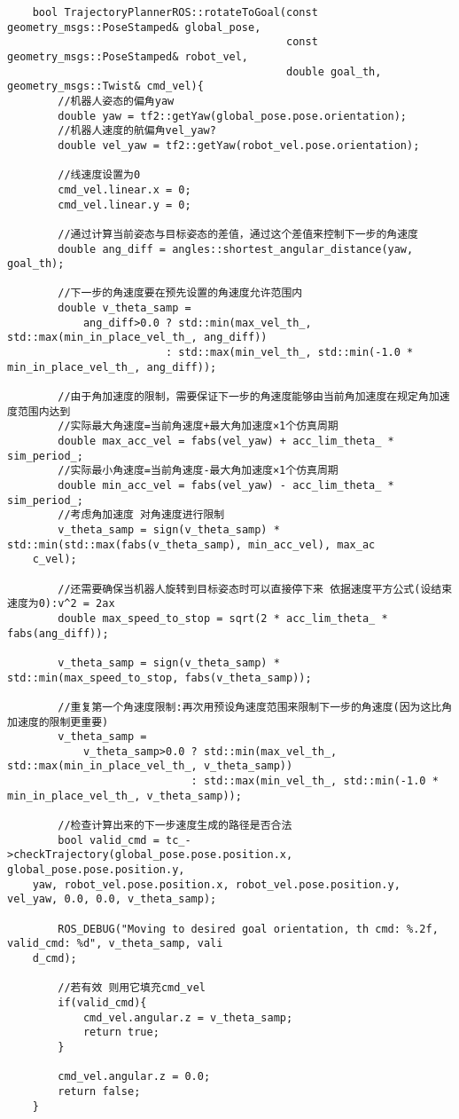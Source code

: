 \documentclass[9pt, oneside]{book}
\begin{document}
\footnotesize
\begin{verbatim}
    bool TrajectoryPlannerROS::rotateToGoal(const geometry_msgs::PoseStamped& global_pose, 
                                            const geometry_msgs::PoseStamped& robot_vel, 
                                            double goal_th, geometry_msgs::Twist& cmd_vel){
        //机器人姿态的偏角yaw
        double yaw = tf2::getYaw(global_pose.pose.orientation);
        //机器人速度的航偏角vel_yaw? 
        double vel_yaw = tf2::getYaw(robot_vel.pose.orientation);
        
        //线速度设置为0
        cmd_vel.linear.x = 0;
        cmd_vel.linear.y = 0;

        //通过计算当前姿态与目标姿态的差值，通过这个差值来控制下一步的角速度
        double ang_diff = angles::shortest_angular_distance(yaw, goal_th);

        //下一步的角速度要在预先设置的角速度允许范围内
        double v_theta_samp = 
            ang_diff>0.0 ? std::min(max_vel_th_, std::max(min_in_place_vel_th_, ang_diff)) 
                         : std::max(min_vel_th_, std::min(-1.0 * min_in_place_vel_th_, ang_diff));

        //由于角加速度的限制，需要保证下一步的角速度能够由当前角加速度在规定角加速度范围内达到
        //实际最大角速度=当前角速度+最大角加速度×1个仿真周期
        double max_acc_vel = fabs(vel_yaw) + acc_lim_theta_ * sim_period_;
        //实际最小角速度=当前角速度-最大角加速度×1个仿真周期
        double min_acc_vel = fabs(vel_yaw) - acc_lim_theta_ * sim_period_;
        //考虑角加速度 对角速度进行限制
        v_theta_samp = sign(v_theta_samp) * std::min(std::max(fabs(v_theta_samp), min_acc_vel), max_ac
    c_vel);

        //还需要确保当机器人旋转到目标姿态时可以直接停下来 依据速度平方公式(设结束速度为0):v^2 = 2ax
        double max_speed_to_stop = sqrt(2 * acc_lim_theta_ * fabs(ang_diff)); 

        v_theta_samp = sign(v_theta_samp) * std::min(max_speed_to_stop, fabs(v_theta_samp));

        //重复第一个角速度限制:再次用预设角速度范围来限制下一步的角速度(因为这比角加速度的限制更重要)
        v_theta_samp = 
            v_theta_samp>0.0 ? std::min(max_vel_th_, std::max(min_in_place_vel_th_, v_theta_samp))
                             : std::max(min_vel_th_, std::min(-1.0 * min_in_place_vel_th_, v_theta_samp));

        //检查计算出来的下一步速度生成的路径是否合法
        bool valid_cmd = tc_->checkTrajectory(global_pose.pose.position.x, global_pose.pose.position.y, 
    yaw, robot_vel.pose.position.x, robot_vel.pose.position.y, vel_yaw, 0.0, 0.0, v_theta_samp);

        ROS_DEBUG("Moving to desired goal orientation, th cmd: %.2f, valid_cmd: %d", v_theta_samp, vali
    d_cmd);

        //若有效 则用它填充cmd_vel
        if(valid_cmd){
            cmd_vel.angular.z = v_theta_samp;
            return true;
        }

        cmd_vel.angular.z = 0.0;
        return false;
    }
\end{verbatim}
\normalsize
\end{document}
